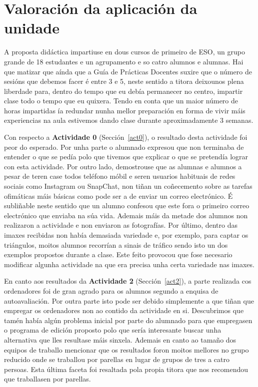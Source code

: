 \section{Valoración da aplicación da unidade}
A proposta didáctica impartiuse en dous cursos de primeiro de ESO, un grupo grande de 18 estudantes e un agrupamento e so catro alumnos e alumnas. Hai que matizar que aínda que a Guía de Prácticas Docentes suxire que o número de sesións que debemos facer é entre 3 e 5, neste sentido a titora deixounos plena liberdade para, dentro do tempo que eu debía permanecer no centro, impartir clase todo o tempo que eu quixera. Tendo en conta que un maior número de horas impartidas ía redundar nunha mellor preparación en forma de vivir máis experiencias na aula estivemos dando clase durante aproximadamente 3 semanas.

Con respecto a \textbf{Actividade 0} (Sección~\ref{act0}), o resultado desta actividade foi peor do esperado. Por unha parte o alumnado expresou que non terminaba de entender o que se pedía polo que tivemos que explicar o que se pretendía lograr con esta actividade. Por outro lado, demostrouse que as alumnas e alumnos a pesar de teren case todos teléfono móbil e seren usuarios habituais de redes sociais como Instagram ou SnapChat, non tiñan un coñecemento sobre as tarefas ofimáticas máis básicas como pode ser a de enviar un correo electrónico. É subliñable neste sentido que un alumno confesou que este fora o primeiro correo electrónico que enviaba na súa vida. Ademais máis da metade dos alumnos non realizaron a actividade e non enviaron as fotografías. Por último, dentro das imaxes recibidas non había demasiada variedade e, por exemplo, para captar os triángulos, moitos alumnos recorrían a sinais de tráfico sendo isto un dos exemplos propostos durante a clase. Este feito provocou que fose necesario modificar algunha actividade na que era precisa unha certa variedade nas imaxes.

En canto aos resultados da \textbf{Actividade 2} (Sección~\ref{act2}), a parte realizada cos ordenadores foi de gran agrado para os alumnos segundo a enquisa de autoavaliación. Por outra parte isto pode ser debido simplemente a que tiñan que empregar os ordenadores non ao contido da actividade en si. Descubrimos que tamén había algún problema inicial por parte do alumnado para que empregasen o programa de edición proposto polo que sería interesante buscar unha alternativa que lles resultase máis sinxela. Ademais en canto ao tamaño dos equipos de traballo mencionar que os resultados foron moitos mellores no grupo reducido onde se traballou por parellas en lugar de grupos de tres a catro persoas. Esta última faceta foi resaltada pola propia titora que nos recomendou que traballasen por parellas.

